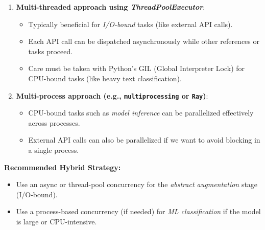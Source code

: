 \documentclass[12pt]{article}
\begin{document}
\begin{enumerate}[label=\Alph*.]
  \item \textbf{Multi-threaded approach using \emph{ThreadPoolExecutor}}:
  \begin{itemize}
    \item Typically beneficial for \emph{I/O-bound} tasks (like external API calls).
    \item Each API call can be dispatched asynchronously while other references or tasks proceed.
    \item Care must be taken with Python’s GIL (Global Interpreter Lock) for CPU-bound tasks (like heavy text classification).
  \end{itemize}

  \item \textbf{Multi-process approach (e.g., \texttt{multiprocessing} or \texttt{Ray})}:
  \begin{itemize}
    \item CPU-bound tasks such as \emph{model inference} can be parallelized effectively across processes. 
    \item External API calls can also be parallelized if we want to avoid blocking in a single process.
  \end{itemize}
\end{enumerate}

\textbf{Recommended Hybrid Strategy:}
\begin{itemize}
  \item Use an async or thread-pool concurrency for the \emph{abstract augmentation} stage (I/O-bound).
  \item Use a process-based concurrency (if needed) for \emph{ML classification} if the model is large or CPU-intensive.
\end{itemize}
\end{document}
